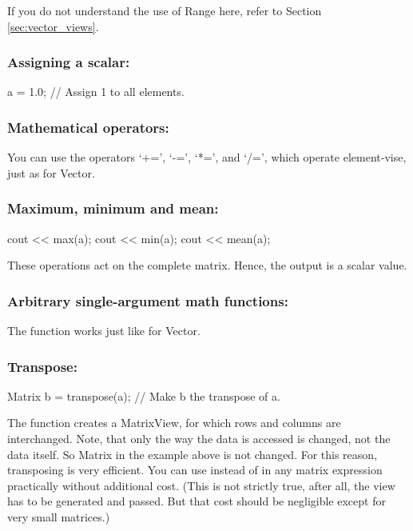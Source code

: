 If you do not understand the use of Range here, refer to Section
\ref{sec:vector_views}. 

\subsubsection{Assigning a scalar:}
\begin{code}
a = 1.0;                        // Assign 1 to all elements.
\end{code}

\subsubsection{Mathematical operators:}

You can use the operators `+=', `-=', `*=', and `/=', which operate
element-vise, just as for Vector.

\subsubsection{Maximum, minimum and mean:}
\begin{code}
cout << max(a);
cout << min(a);
cout << mean(a);
\end{code}
These operations act on the complete matrix. Hence, the output is a scalar
value.

\subsubsection{Arbitrary single-argument math functions:}

The function  works just like for Vector.

\subsubsection{Transpose:}
\begin{code}
Matrix b = transpose(a); // Make b the transpose of a.
\end{code}

The function  creates a MatrixView, for which rows and
columns are interchanged. Note, that only the way the data is accessed
is changed, not the data itself. So Matrix  in the example
above is not changed. For this reason, transposing is very efficient.
You can use  instead of  in any matrix
expression practically without additional cost. (This is not strictly
true, after all, the view has to be generated and passed. But that
cost should be negligible except for very small matrices.)

